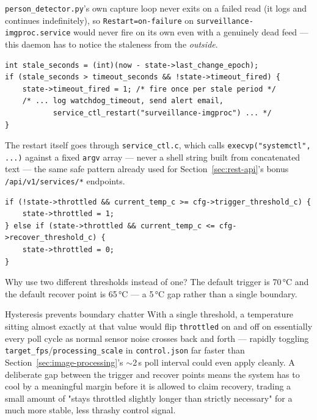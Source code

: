 
\texttt{person\_detector.py}'s own capture loop never exits on a failed
read (it logs and continues indefinitely), so
\texttt{Restart=on-failure} on \texttt{surveillance-imgproc.service}
would never fire on its own even with a genuinely dead feed --- this
daemon has to notice the staleness from the \emph{outside}.

\begin{lstlisting}[style=cstyle_bright_2026, caption={\texttt{watchdog\_check()} --- fires once per stale period, not on every poll cycle while already stale.}, label={code:watchdog-check}]
int stale_seconds = (int)(now - state->last_change_epoch);
if (stale_seconds > timeout_seconds && !state->timeout_fired) {
    state->timeout_fired = 1; /* fire once per stale period */
    /* ... log watchdog_timeout, send alert email,
           service_ctl_restart("surveillance-imgproc") ... */
}
\end{lstlisting}

The restart itself goes through \texttt{service\_ctl.c}, which calls
\texttt{execvp("systemctl", ...)} against a fixed \texttt{argv} array ---
never a shell string built from concatenated text --- the same safe
pattern already used for Section~\ref{sec:rest-api}'s bonus
\texttt{/api/v1/services/*} endpoints.


\begin{lstlisting}[style=cstyle_bright_2026, caption={\texttt{thermal.c} --- hysteresis check. The recover threshold is deliberately lower than the trigger threshold.}, label={code:thermal-hysteresis}]
if (!state->throttled && current_temp_c >= cfg->trigger_threshold_c) {
    state->throttled = 1;
} else if (state->throttled && current_temp_c <= cfg->recover_threshold_c) {
    state->throttled = 0;
}
\end{lstlisting}

\begin{questionsection}{Why use two different thresholds instead of one?}
The default trigger is 70\,°C and the default recover point is 65\,°C
--- a 5\,°C gap rather than a single boundary.
\end{questionsection}

\begin{answersection}{Hysteresis prevents boundary chatter}
With a single threshold, a temperature sitting almost exactly at that
value would flip \texttt{throttled} on and off on essentially every poll
cycle as normal sensor noise crosses back and forth --- rapidly toggling
\texttt{target\_fps}/\texttt{processing\_scale} in
\texttt{control.json} far faster than
Section~\ref{sec:image-processing}'s $\sim$2\,s poll interval could even
apply cleanly. A deliberate gap between the trigger and recover points
means the system has to cool by a meaningful margin before it is allowed
to claim recovery, trading a small amount of "stays throttled slightly
longer than strictly necessary" for a much more stable, less thrashy
control signal.
\end{answersection}

